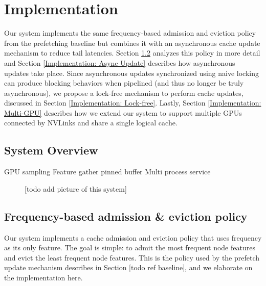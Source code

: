 \chapter{Implementation}

Our system implements the same frequency-based admission and eviction policy from the prefetching baseline but combines it with an asynchronous cache update mechanism to reduce tail latencies. 
Section \ref{Implementation: Policy} analyzes this policy in more detail and Section \ref{Implementation: Async Update} describes how asynchronous updates take place. 
Since asynchronous updates synchronized using naive locking can produce blocking behaviors when pipelined (and thus no longer be truly asynchronous), we propose a lock-free mechanism to perform cache updates, discussed in Section \ref{Implementation: Lock-free}.
Lastly, Section \ref{Implementation: Multi-GPU} describes how we extend our system to support multiple GPUs connected by NVLinks and share a single logical cache.

\section{System Overview}


GPU sampling
Feature gather pinned buffer
Multi process service

\begin{figure}[h!]
    \centering
    
    \caption{[todo add picture of this system]}
    \label{Our system diagram}
\end{figure}    


\section{Frequency-based admission \& eviction policy} \label{Implementation: Policy}

Our system implements a cache admission and eviction policy that uses frequency as its only feature. The goal is simple: to admit the most frequent node features and evict the least frequent node features. This is the policy used by the prefetch update mechanism describes in Section [todo ref baseline], and we elaborate on the implementation here.

